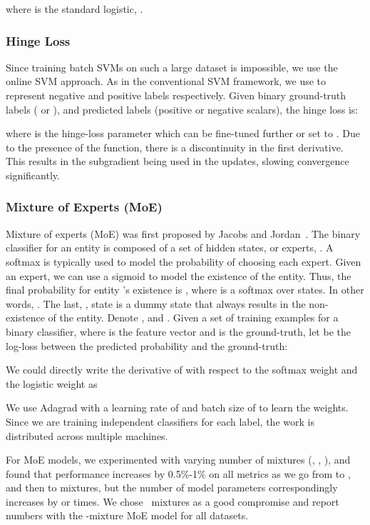 \documentclass{sig-alternate-05-2015}
\begin{document}
where  is the standard logistic, .

\subsubsection{Hinge Loss}
Since training batch SVMs on such a large dataset is impossible, we use the online SVM approach. As in the conventional SVM framework, we use  to represent negative and positive labels respectively. Given binary ground-truth labels  ( or ), and predicted labels  (positive or negative scalars), the hinge loss is:

where  is the hinge-loss parameter which can be fine-tuned further or set to . Due to the presence of the  function, there is a discontinuity in the first derivative. This results in the subgradient being used in the updates, slowing convergence significantly.

\subsubsection{Mixture of Experts (MoE)}
Mixture of experts (MoE) was first proposed by Jacobs and Jordan~\cite{Jordan94hierarchicalmixtures}. The binary classifier for an entity  is composed of a set of hidden states, or experts, . A softmax is typically used to model the probability of choosing each expert. Given an expert, we can use a sigmoid to model the existence of the entity. Thus, the final probability for entity 's existence is , where   is a softmax over  states. In other words, .
The last, , state is a dummy state that always results in the non-existence of the entity. Denote ,  and . Given a set of training examples  for a binary classifier, where  is the feature vector and  is the ground-truth, let  be the log-loss between the predicted probability and the ground-truth:

We could directly write the derivative of  with respect to the softmax weight  and the logistic weight  as

We use Adagrad with a learning rate of  and batch size of  to learn the weights. Since we are training independent classifiers for each label, the work is distributed across multiple machines.

For MoE models, we experimented with varying number of mixtures (, , ),
and found that performance increases by 0.5\%-1\% on all metrics as we go from
 to , and then to  mixtures, but the number of model parameters
correspondingly increases by  or  times. We chose ~mixtures as a good
compromise and report numbers with the -mixture MoE model for all datasets.
  
\end{document}

